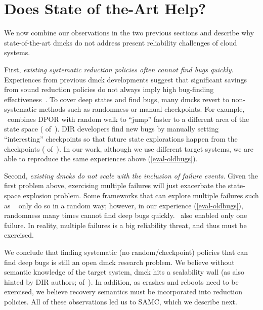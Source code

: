 

\section{Does State of the-Art Help?}
\label{mot-summ}

We now combine our observations in the two previous sections and
describe why state-of-the-art dmcks do not address present reliability
challenges of cloud systems.



First, {\em existing systematic reduction policies often cannot find
  bugs quickly}.  Experiences from previous dmck developments suggest
that significant savings from sound reduction policies do not always
imply high bug-finding effectiveness~\cite{Guo+11-Demeter,
  Yang+09-Modist}.  To cover deep states and find bugs, many dmcks
revert to non-systematic methods such as randomness or manual
checkpoints.  For example, \modist\ combines DPOR with random walk to
``jump'' faster to a different area of the state space (
of~\cite{Yang+09-Modist}).  DIR developers find new bugs by manually
setting ``interesting'' checkpoints so that future state explorations
happen from the checkpoints ( of~\cite{Guo+11-Demeter}).  In
our work, although we use different target systems, we are able to
reproduce the same experiences above (\sec\ref{eval-oldbugs}).



Second, {\em existing dmcks do not scale with the inclusion of failure
  events}.  Given the first problem above, exercising multiple
failures will just exacerbate the state-space explosion problem.  Some
frameworks that can explore multiple failures such as
\macemc~\cite{Killian+07-LifeDeathMaceMC} only do so in a random way;
however, in our experience (\sec\ref{eval-oldbugs}), randomness many
times cannot find deep bugs quickly.  \modist\ also enabled only one
failure.  In reality, multiple failures is a big reliability threat,
and thus must be exercised.


We conclude that finding systematic (no random/checkpoint) policies
that can find deep bugs is still an open dmck research problem.  We
believe without semantic knowledge of the target system, dmck hits a
scalability wall (as also hinted by DIR authors; 
of~\cite{Guo+11-Demeter}).  In addition, as crashes and reboots need
to be exercised, we believe recovery semantics must be incorporated into
reduction policies.  All of these observations led us to SAMC, which
we describe next.


